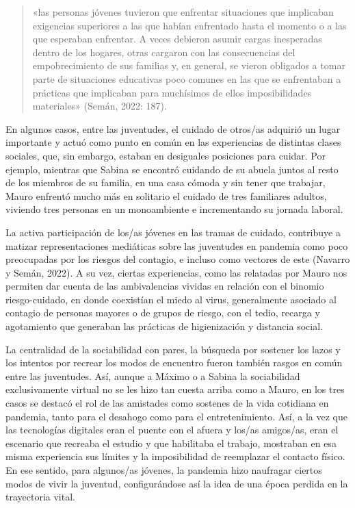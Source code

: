 \begin{quote}
«las personas jóvenes tuvieron que enfrentar situaciones que implicaban exigencias superiores a las que habían enfrentado hasta el momento o a las que esperaban enfrentar. A veces debieron asumir cargas inesperadas dentro de los hogares, otras cargaron con las consecuencias del empobrecimiento de sus familias y, en general, se vieron obligados a tomar parte de situaciones educativas poco comunes en las que se enfrentaban a prácticas que implicaban para muchísimos de ellos imposibilidades materiales» (Semán, 2022: 187).
\end{quote}

En algunos casos, entre las juventudes, el cuidado de otros/as adquirió un lugar importante y actuó como punto en común en las experiencias de distintas clases sociales, que, sin embargo, estaban en desiguales posiciones para cuidar. Por ejemplo, mientras que Sabina se encontró cuidando de su abuela juntos al resto de los miembros de su familia, en una casa cómoda y sin tener que trabajar, Mauro enfrentó mucho más en solitario el cuidado de tres familiares adultos, viviendo tres personas en un monoambiente e incrementando su jornada laboral.

La activa participación de los/as jóvenes en las tramas de cuidado, contribuye a matizar representaciones mediáticas sobre las juventudes en pandemia como poco preocupadas por los riesgos del contagio, e incluso como vectores de este (Navarro y Semán, 2022). A su vez, ciertas experiencias, como las relatadas por Mauro nos permiten dar cuenta de las ambivalencias vividas en relación con el binomio riesgo-cuidado, en donde coexistían el miedo al virus, generalmente asociado al contagio de personas mayores o de grupos de riesgo, con el tedio, recarga y agotamiento que generaban las prácticas de higienización y distancia social.

La centralidad de la sociabilidad con pares, la búsqueda por sostener los lazos y los intentos por recrear los modos de encuentro fueron también rasgos en común entre las juventudes. Así, aunque a Máximo o a Sabina la sociabilidad exclusivamente virtual no se les hizo tan cuesta arriba como a Mauro, en los tres casos se destacó el rol de las amistades como sostenes de la vida cotidiana en pandemia, tanto para el desahogo como para el entretenimiento. Así, a la vez que las tecnologías digitales eran el puente con el afuera y los/as amigos/as, eran el escenario que recreaba el estudio y que habilitaba el trabajo, mostraban en esa misma experiencia sus límites y la imposibilidad de reemplazar el contacto físico. En ese sentido, para algunos/as jóvenes, la pandemia hizo naufragar ciertos modos de vivir la juventud, configurándose así la idea de una época perdida en la trayectoria vital.

